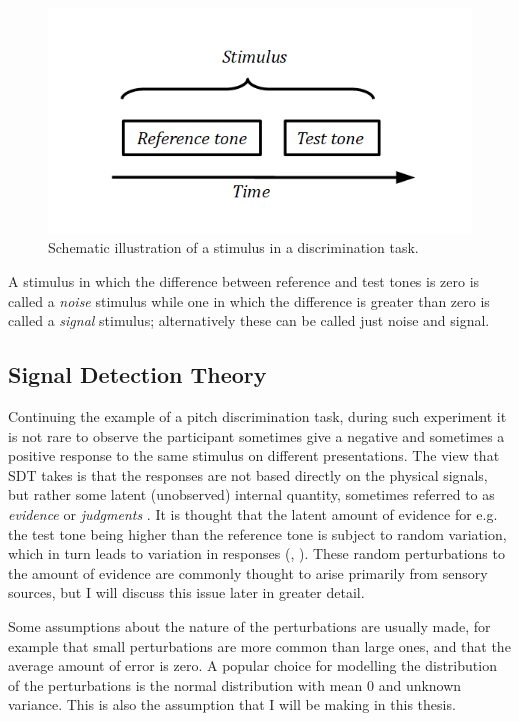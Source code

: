 \documentclass{article}\usepackage{knitr}
\begin{document}
\begin{figure}[!htb]
\centering
\includegraphics[scale = 0.5]{DiscriminationTask}
\caption{Schematic illustration of a stimulus in a discrimination task.}
\label{fig:discrtask}
\end{figure}

A stimulus in which the difference between reference and test tones is zero is called a \textit{noise} stimulus while one in which the difference is greater than zero is called a \textit{signal} stimulus; alternatively these can be called just noise and signal. 

\subsection{Signal Detection Theory}

Continuing the example of a  pitch discrimination task, during such experiment it is not rare to observe the participant sometimes give a negative and sometimes a positive response to the same stimulus on different presentations. The view that SDT takes is that the responses are not based directly on the physical signals, but rather some latent (unobserved) internal quantity, sometimes referred to as \textit{evidence} \citep{wickens2002} or \textit{judgments} \cite{stigler2003}. It is thought that the latent amount of evidence for e.g. the test tone being higher than the reference tone is subject to random variation, which in turn leads to variation in responses (\citet[p. 154]{kingdomprins2010}, \citet[p. 11]{wickens2002}). These random perturbations to the amount of evidence are commonly thought to arise primarily from sensory sources, but I will discuss this issue later in greater detail.

Some assumptions about the nature of the perturbations are usually made, for example that small perturbations are more common than large ones, and that the average amount of error is zero. A popular choice for modelling the distribution of the perturbations is the normal distribution with mean 0 and unknown variance. This is also the assumption that I will be making in this thesis.
\end{document}
